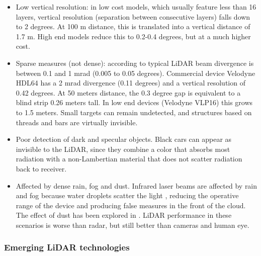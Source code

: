 \begin{itemize}    
    \item Low vertical resolution: in low cost models, which usually feature 
    less than 16 layers, vertical resolution (separation between consecutive
    layers) falls down to 2 degrees. At 100 m distance, this is translated into 
    a vertical distance of 1.7 m. High end models reduce this to 0.2-0.4 
    degrees, but at a much higher cost.
    
    \item Sparse measures (not dense): according to \cite{Gatziolis2008} typical
    LiDAR beam divergence is between 0.1 and 1 mrad (0.005 to 0.05 degrees).
    Commercial device Velodyne HDL64 has a 2 mrad divergence \cite{Glennie2010} 
    (0.11 degrees) and a vertical resolution of 0.42 degrees. At 50 meters 
    distance, the 0.3 degree gap is equivalent to a blind strip 0.26 meters
    tall. In low end devices (Velodyne VLP16) this grows to 1.5 meters. 
    Small targets can remain undetected, and structures based on threads and 
    bars are virtually invisible.
    
    \item Poor detection of dark and specular objects. Black cars
    can appear as invisible to the LiDAR, since they combine a color that
    absorbs most radiation with a non-Lambertian material that does not scatter
    radiation back to receiver.
    
    
    \item Affected by dense rain, fog and dust. Infrared laser
    beams are affected by rain and fog because water droplets scatter the light 
    \cite{Wang2008}, reducing the operative range of the device and producing 
    false measures in the front of the cloud. The effect of dust has been
    explored in \cite{Phillips2017}. LiDAR performance in these scenarios is 
    worse than radar, but still better than cameras and human eye.
\end{itemize}

\subsubsection{Emerging LiDAR technologies}
\label{sec:03-lidar-emerging}

